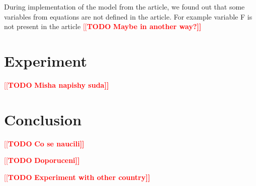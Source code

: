 \documentclass[12pt,a4paper,english]{article}
\newcommand{\todo}[1]{\textcolor{red}{[[\textbf{TODO} \textbf{#1]]}}}
\begin{document}
    During implementation of the model from the article, we found out that some variables from equations are not defined in the article. 
    For example variable F is not present in the article \todo{Maybe in another way?} 

    \section{Experiment}
    
    \todo{Misha napishy suda}

    \section{Conclusion}
    \todo{Co se naucili}
    
    \todo{Doporuceni}

    \todo{Experiment with other country}

    \clearpage
	
	
\end{document}
